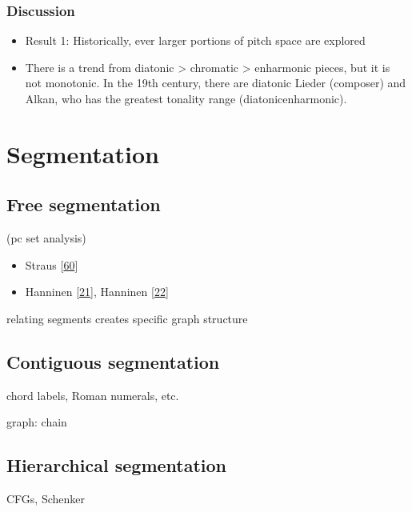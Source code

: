 \documentclass[letterpaper,10pt,english]{sphinxmanual}
\begin{document}
\subsection{Discussion}
\label{\detokenize{topic_modeling:discussion}}\begin{itemize}
\item {} 
\sphinxAtStartPar
Result 1: Historically, ever larger portions of pitch space are explored

\item {} 
\sphinxAtStartPar
There is a trend from diatonic \textgreater{} chromatic \textgreater{} enharmonic pieces, but it
is not monotonic. In the 19th century, there are diatonic Lieder
(composer) and Alkan, who has the greatest tonality range
(diatonic\sphinxhyphen{}enharmonic).

\end{itemize}


\chapter{Segmentation}
\label{\detokenize{5_segmentation:segmentation}}\label{\detokenize{5_segmentation::doc}}

\section{Free segmentation}
\label{\detokenize{5_segmentation:free-segmentation}}
\sphinxAtStartPar
(pc set analysis)
\begin{itemize}
\item {} 
\sphinxAtStartPar
Straus {[}\hyperlink{cite.8_bibliography:id3}{60}{]}

\item {} 
\sphinxAtStartPar
Hanninen {[}\hyperlink{cite.8_bibliography:id56}{21}{]}, Hanninen {[}\hyperlink{cite.8_bibliography:id57}{22}{]}

\end{itemize}

\sphinxAtStartPar
relating segments creates specific graph structure


\section{Contiguous segmentation}
\label{\detokenize{5_segmentation:contiguous-segmentation}}
\sphinxAtStartPar
chord labels, Roman numerals, etc.

\sphinxAtStartPar
graph: chain


\section{Hierarchical segmentation}
\label{\detokenize{5_segmentation:hierarchical-segmentation}}
\sphinxAtStartPar
CFGs, Schenker
\end{document}
